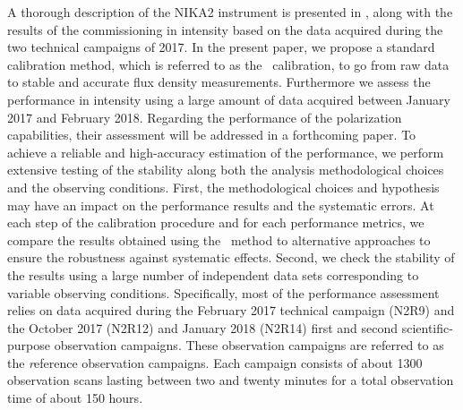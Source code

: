 A thorough description of the NIKA2 instrument is presented in \citet{Adam2018},
along with the results of the commissioning in intensity based on the
data acquired during the two technical campaigns of 2017.
%
{\lp In the present paper, we propose a standard calibration method, which is
referred to as the \baseline\ calibration, to go from raw data to
stable and accurate flux density measurements.} 
%
%
Furthermore we assess the performance in intensity using a large
amount of data acquired between January 2017 and February 2018.
Regarding the performance of the polarization capabilities, their
assessment will be addressed in a forthcoming paper.
To achieve a reliable and high-accuracy estimation
of the performance, we perform extensive testing of the
stability along both the analysis methodological
choices and the observing conditions.
{\lp First, the methodological choices and hypothesis may have an impact on
the performance results and the systematic errors. At each step of the
calibration procedure and for each performance metrics, we compare the
results obtained using the \baseline\ method to alternative approaches to
ensure the robustness against systematic effects.}
Second, we check the stability of the results using a large number of
independent data sets corresponding to variable observing conditions.
Specifically, most of the performance assessment relies on data
acquired during the February 2017 technical campaign (N2R9) and the
October 2017 (N2R12) and January 2018 (N2R14) first and second
scientific-purpose observation campaigns. {\lp These observation
campaigns are referred to as the {\emph reference observation campaigns}.}
Each campaign consists of about 1300 observation scans lasting between
two and twenty minutes for a total observation time of about 150 hours. 

